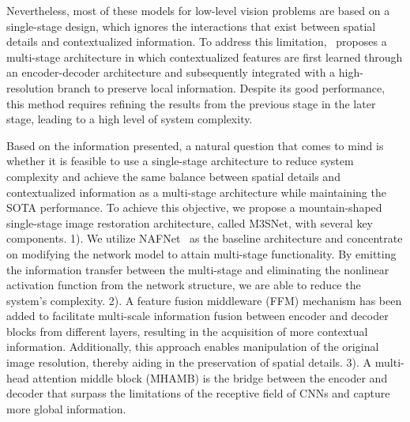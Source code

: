 \documentclass[sn-mathphys,Numbered]{sn-jnl}
\theoremstyle{thmstyleone}\newtheorem{theorem}{Theorem}\newtheorem{proposition}[theorem]{Proposition}
\theoremstyle{thmstyletwo}\newtheorem{example}{Example}\newtheorem{remark}{Remark}
\theoremstyle{thmstylethree}\newtheorem{definition}{Definition}
\begin{document}
Nevertheless, most of these models for low-level vision problems are based on a single-stage design, which ignores the interactions that exist between spatial details and contextualized information. To address this limitation,~\cite{Zamir2021MPRNet, Chen_2021_CVPR,PREnet,RESCAN} proposes a multi-stage architecture in which contextualized features are first learned through an encoder-decoder architecture and subsequently integrated with a high-resolution branch to preserve local information. Despite its good performance, this method requires refining the results from the previous stage in the later stage, leading to a high level of system complexity.

Based on the information presented, a natural question that comes to mind is whether it is feasible to use a single-stage architecture to reduce system complexity and  achieve the same balance between spatial details and contextualized information as a multi-stage architecture while  maintaining the SOTA performance. To achieve this objective, we propose a mountain-shaped single-stage image restoration architecture, called M3SNet, with several key components. 1). We utilize NAFNet~\cite{chen2022simple} as the baseline architecture and concentrate on modifying the network model to attain multi-stage functionality. By emitting the information transfer between the multi-stage and eliminating the nonlinear activation function from the network structure, we are able to reduce the system's complexity. 2). A feature fusion middleware (FFM) mechanism has been added to facilitate multi-scale information fusion between encoder and decoder blocks from different layers, resulting in the acquisition of more contextual information. Additionally, this approach enables manipulation of the original image resolution, thereby aiding in the preservation of spatial details.
3). A multi-head attention middle block (MHAMB) is the bridge between the encoder and decoder that  surpass the limitations of the receptive field of CNNs and capture more global information.
\end{document}
